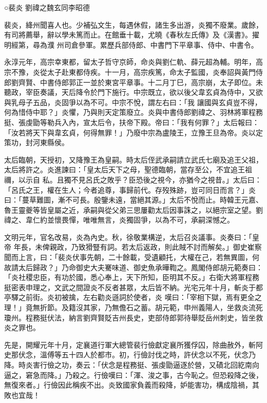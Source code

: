 
\begin{pinyinscope}

 ○裴炎
 劉禕之魏玄同李昭德



 裴炎，絳州聞喜人也。少補弘文生，每遇休假，諸生多出游，炎獨不廢業。歲餘，有司將薦舉，辭以學未篤而止。在館垂十載，尤曉《春秋左氏傳》及《漢書》。擢明經第，尋為濮
 州司倉參軍。累歷兵部侍郎、中書門下平章事、侍中、中書令。



 永淳元年，高宗幸東都，留太子哲守京師，命炎與劉仁軌、薛元超為輔。明年，高宗不豫，炎從太子赴東都侍疾。十一月，高宗疾篤，命太子監國，炎奉詔與黃門侍郎劉齊賢、中書侍郎郭正一並於東宮平章事。十二月丁巳，高宗崩，太子即位。未聽政，宰臣奏議，天后降令於門下施行。中宗既立，欲以後父韋玄貞為侍中，又欲與乳母子五品，炎固爭以為不可。中宗不悅，謂左右曰：「我
 讓國與玄貞豈不得，何為惜侍中耶？」炎懼，乃與則天定策廢立。炎與中書侍郎劉禕之、羽林將軍程務挺、張虔勖等勒兵入內，宣太后令，扶帝下殿。帝曰：「我有何罪？」太后報曰：「汝若將天下與韋玄貞，何得無罪！」乃廢中宗為盧陵王，立豫王旦為帝。炎以定策功，封河東縣侯。



 太后臨朝，天授初，又降豫王為皇嗣。時太后侄武承嗣請立武氏七廟及追王父祖，太后將許之。炎進諫曰：「皇太后天下之母，聖德臨朝，當存至公，不宜追王祖禰，以示自
 私。且獨不見呂氏之敗乎？臣恐後之視今，亦猶今之視昔。」太后曰：「呂氏之王，權在生人；今者追尊，事歸前代。存歿殊跡，豈可同日而言？」炎曰：「蔓草難圖，漸不可長。殷鑒未遠，當絕其源。」太后不悅而止。時韓王元嘉、魯王靈夔等皆皇屬之近，承嗣與從父弟三思屢勸太后因事誅之，以絕宗室之望。劉禕之、韋仁約並懷畏憚，唯唯無言，炎獨固爭，以為不可，承嗣深憾之。



 文明元年，官名改易，炎為內史。秋，徐敬業構逆，太后召炎議事。炎奏曰：「皇帝
 年長，未俾親政，乃致猾豎有詞。若太后返政，則此賊不討而解矣。」御史崔察聞而上言，曰：「裴炎伏事先朝，二十餘載，受遺顧托，大權在己，若無異圖，何故請太后歸政？」乃命御史大夫騫味道、御史魚承曄鞫之。鳳閣侍郎胡元範奏曰：「炎社稷忠臣，有功於國，悉心奉上，天下所知，臣明其不反。」右衛大將軍程務挺密表申理之，文武之間證炎不反者甚眾，太后皆不納。光宅元年十月，斬炎于都亭驛之前街。炎初被擒，左右勸炎遜詞於使者，炎
 嘆曰：「宰相下獄，焉有更全之理！」竟無折節。及籍沒其家，乃無儋石之蓄。胡元範，申州義陽人，坐救炎流死瓊州。程務挺伏法，納言劉齊賢貶吉州長史，吏部侍郎郭待舉貶岳州刺史，皆坐救炎之罪也。



 先是，開耀元年十月，定襄道行軍大總管裴行儉獻定襄所獲俘囚，除曲赦外，斬阿史那伏念，溫傅等五十四人於都市。初，行儉討伐之時，許伏念以不死，伏念乃降。時炎害行儉之功，奏云：「伏念是程務挺、張虔勖逼逐於營，又磧北回紇南向
 逼之，窘急而降。」乃殺之。行儉嘆曰：「渾、浚之事，古今恥之。但恐殺降之後，無復來者。」行儉因此稱疾不出。炎致國家負義而殺降，妒能害功，構成陰禍，其敗也宜哉！




\end{pinyinscope}
